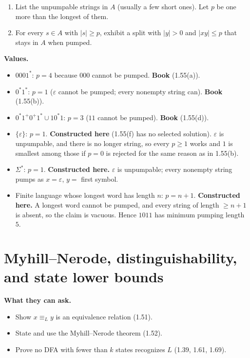 \documentclass[11pt,a4paper]{article}
\newcommand{\eps}{\varepsilon}
\begin{document}
\begin{enumerate}
  \item List the unpumpable strings in $A$ (usually a few short
        ones). Let $p$ be one more than the longest of them.
  \item For every $s\in A$ with $|s|\ge p$, exhibit a split with
        $|y|>0$ and $|xy|\le p$ that stays in $A$ when pumped.
\end{enumerate}

\textbf{Values.}
\begin{itemize}[nosep]
  \item $0001^*$: $p=4$ because $000$ cannot be pumped.
        \textbf{Book} (1.55(a)).
  \item $0^*1^*$: $p=1$ ($\eps$ cannot be pumped; every nonempty
        string can). \textbf{Book} (1.55(b)).
  \item $0^*1^+0^+1^*\cup 10^*1$: $p=3$ ($11$ cannot be pumped).
        \textbf{Book} (1.55(d)).
  \item $\{\eps\}$: $p=1$. \textbf{Constructed here} (1.55(f) has
        no selected solution). $\eps$ is unpumpable, and there is
        no longer string, so every $p\ge 1$ works and $1$ is
        smallest among those if $p=0$ is rejected for the same
        reason as in 1.55(b).
  \item $\Sigma^*$: $p=1$. \textbf{Constructed here.} $\eps$ is
        unpumpable; every nonempty string pumps as $x=\eps$,
        $y=$ first symbol.
  \item Finite language whose longest word has length $n$:
        $p=n+1$. \textbf{Constructed here.} A longest word cannot
        be pumped, and every string of length $\ge n+1$ is absent,
        so the claim is vacuous. Hence $1011$ has minimum pumping
        length $5$.
\end{itemize}

\section{Myhill--Nerode, distinguishability, and state lower bounds}
\label{type:mn}

\textbf{What they can ask.}
\begin{itemize}[nosep]
  \item Show $x\equiv_L y$ is an equivalence relation (1.51).
  \item State and use the Myhill--Nerode theorem (1.52).
  \item Prove no DFA with fewer than $k$ states recognizes $L$
        (1.39, 1.61, 1.69).
\end{itemize}
\end{document}
